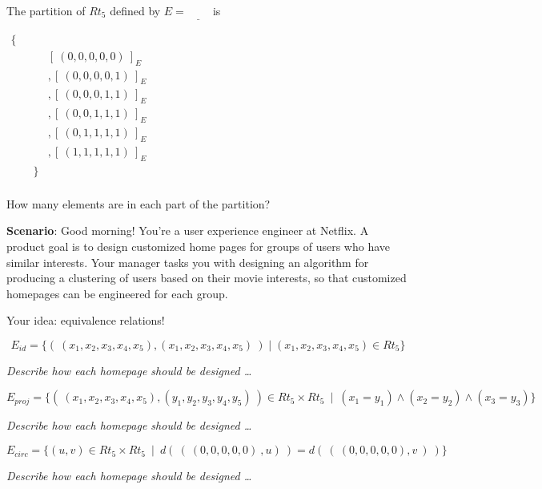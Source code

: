 \documentclass[12pt, oneside]{article}
\begin{document}
The partition of $Rt_5$ defined by $E = \underline{\phantom{E_{circ}}}$ is

\begin{math}
\begin{aligned}
    \{ ~~  & \\
    &[ ~(0,0,0,0,0)~ ]_E   \\
    &, [ ~(0,0,0,0,1)~ ]_E \\
    &, [ ~(0,0,0,1,1)~ ]_E \\
    &, [ ~(0,0,1,1,1)~ ]_E \\
    &, [ ~(0,1,1,1,1)~ ]_E \\
    &, [ ~(1,1,1,1,1)~ ]_E \\
    \qquad\}  & \\
\end{aligned}
\end{math}

How many elements are in each part of the partition? 

{\bf Scenario}: Good morning! You're a user experience engineer at Netflix. A
product goal is to design customized home pages for groups of users who have
similar interests. Your manager tasks you with designing an algorithm for
producing a clustering of users based on their movie interests,
so that customized homepages can be engineered for each group.



Your idea: equivalence relations! 


\[
    E_{id} = \{ ( ~(x_1, x_2, x_3, x_4, x_5), (x_1, x_2, x_3, x_4, x_5)~) \mid 
    (x_1, x_2, x_3, x_4, x_5) \in Rt_5  \}
\]

{\it Describe how each homepage should be designed \ldots }

\vspace{100pt}



\[
    E_{proj} =  \{ ( ~(x_1, x_2, x_3, x_4, x_5), (y_1, y_2, y_3, y_4, y_5)~) \in
         Rt_5 \times Rt_5 ~\mid~(x_1 = y_1) \land  (x_2 = y_2) \land (x_3 = y_3) \}
\]


{\it Describe how each homepage should be designed \ldots }

\vspace{100pt}

\[
E_{circ} =  \{ (u,v) \in Rt_5 \times Rt_5 ~\mid~ d(~ ( ~(0,0,0,0,0)~, u)~ ) =  d( ~(~(0,0,0,0,0),v~)~) \}
\]

{\it Describe how each homepage should be designed \ldots }


\vspace{100pt}
\end{document}
